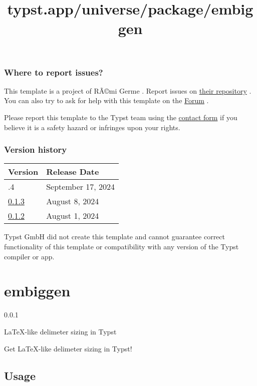 \subsubsection{Where to report issues?}\label{where-to-report-issues}

This template is a project of RÃ©mi Germe . Report issues on
\href{https://github.com/remigerme/typst-polytechnique}{their
repository} . You can also try to ask for help with this template on the
\href{https://forum.typst.app}{Forum} .

Please report this template to the Typst team using the
\href{https://typst.app/contact}{contact form} if you believe it is a
safety hazard or infringes upon your rights.

\label{versions}
\subsubsection{Version history}\label{version-history}

\begin{longtable}[]{@{}ll@{}}
\toprule\noalign{}
Version & Release Date \\
\midrule\noalign{}
\endhead
\bottomrule\noalign{}
\endlastfoot
0.1.4 & September 17, 2024 \\
\href{https://typst.app/universe/package/typographix-polytechnique-reports/0.1.3/}{0.1.3}
& August 8, 2024 \\
\href{https://typst.app/universe/package/typographix-polytechnique-reports/0.1.2/}{0.1.2}
& August 1, 2024 \\
\end{longtable}

Typst GmbH did not create this template and cannot guarantee correct
functionality of this template or compatibility with any version of the
Typst compiler or app.


\title{typst.app/universe/package/embiggen}

\label{banner}
\section{embiggen}\label{embiggen}

{ 0.0.1 }

LaTeX-like delimeter sizing in Typst

\label{readme}
Get LaTeX-like delimeter sizing in Typst!

\subsection{Usage}\label{usage}

